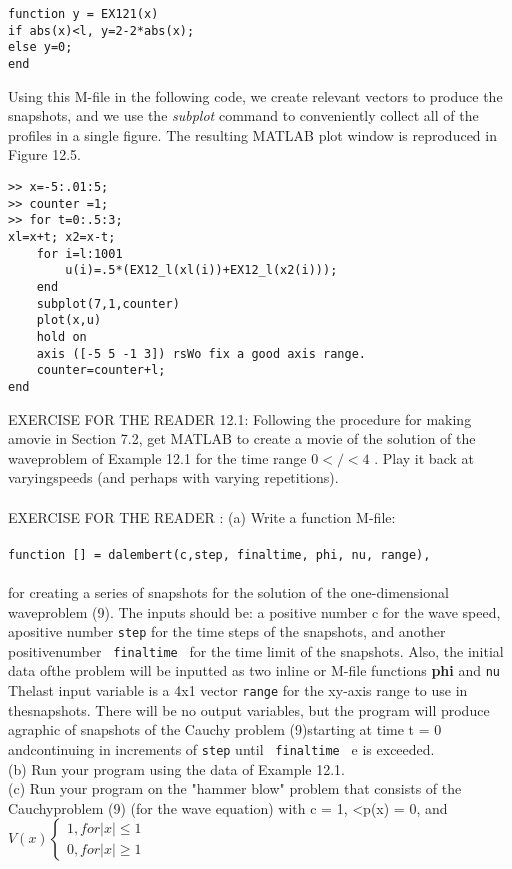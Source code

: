 \documentclass[../main.tex]{subfiles}
\begin{document}
\begin{verbatim}
function y = EX121(x)
if abs(x)<l, y=2-2*abs(x);
else y=0;
end
\end{verbatim}
Using this M-file in the following code, we create relevant vectors to produce the
snapshots, and we use the \textit{subplot} command to conveniently collect all of the
profiles in a single figure. The resulting MATLAB plot window is reproduced in
Figure 12.5. 
\begin{lstlisting}[numbers=none,frame=none]
>> x=-5:.01:5; 
>> counter =1; 
>> for t=0:.5:3; 
xl=x+t; x2=x-t; 
	for i=l:1001 
		u(i)=.5*(EX12_l(xl(i))+EX12_l(x2(i))); 
	end 
	subplot(7,1,counter) 
	plot(x,u) 
	hold on 
	axis ([-5 5 -1 3]) rsWo fix a good axis range. 
	counter=counter+l; 
end  
\end{lstlisting}
EXERCISE FOR THE READER 12.1: Following the procedure for making amovie in Section 7.2, get MATLAB to create a movie of the solution of the waveproblem of Example 12.1 for the time range 
$0</<4$ . Play it back at varyingspeeds (and perhaps with varying repetitions).
\\
\\
EXERCISE FOR THE READER : (a) Write a function M-file:
\\
\\
\texttt{function [] = dalembert(c,step, finaltime, phi, nu, range), }
\\
\\
for creating a series of snapshots for the solution of the one-dimensional waveproblem (9). The inputs should be: a positive number c for the wave speed, apositive number \texttt{step}  for the time steps of the snapshots, and another positivenumber \texttt{ finaltime } for the time limit of the snapshots. Also, the initial data ofthe problem will be inputted as two inline or M-file functions \textbf{phi} and \texttt{nu} Thelast input variable is a 4x1 vector \texttt{range} for the xy-axis range to use in thesnapshots. There will be no output variables, but the program will produce agraphic of snapshots of the Cauchy problem (9)starting at time t = 0 andcontinuing in increments of \texttt{step} until \texttt{ finaltime } e is exceeded.\\(b) Run your program using the data of Example 12.1.\\(c) Run your program on the "hammer blow" problem that consists of the Cauchyproblem (9) (for the wave equation) with c = 1, <p(x) = 0, and
$V(x)
\begin{cases} 
1, for \vert x \vert \leqslant 1\\
0, for  \vert x\vert\geqslant 1
\end{cases}$
\end{document}
